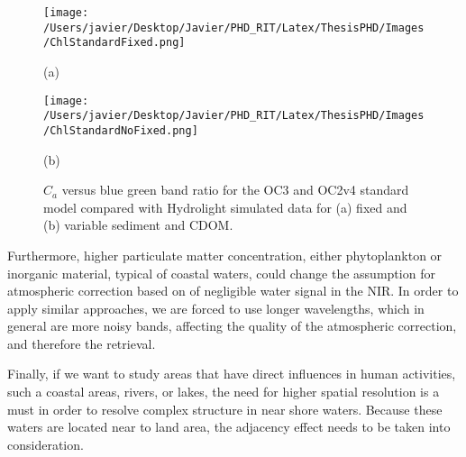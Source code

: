 \begin{figure}[htb!]
  \begin{minipage}[c]{0.48\linewidth}
    \centering
      \texttt{[image: /Users/javier/Desktop/Javier/PHD\_RIT/Latex/ThesisPHD/Images/ChlStandardFixed.png]}\\
      \centerline{(a)}\medskip
  \end{minipage}
  \hfill      
  \begin{minipage}[c]{0.48\linewidth}
    \centering
      \texttt{[image: /Users/javier/Desktop/Javier/PHD\_RIT/Latex/ThesisPHD/Images/ChlStandardNoFixed.png]}\\
      \centerline{(b)}\medskip
  \end{minipage}
      \caption{$C_a$ versus blue green band ratio for the OC3 and OC2v4 standard model compared with Hydrolight simulated data for (a) fixed and (b) variable sediment and CDOM.\label{fig:ChlStandardFixedAntNot} } 
\end{figure}

Furthermore, higher particulate matter concentration, either phytoplankton or inorganic material, typical of coastal waters, could change the assumption for atmospheric correction based on \citet{Gordon:1994} of negligible water signal in the NIR. In order to apply similar approaches, we are forced to use longer wavelengths, which in general are more noisy bands, affecting the quality of the atmospheric correction, and therefore the retrieval.

Finally, if we want to study areas that have direct influences in human activities, such a coastal areas, rivers, or lakes, the need for higher spatial resolution is a must in order to resolve complex structure in near shore waters. Because these waters are located near to land area, the adjacency effect needs to be taken into consideration.



